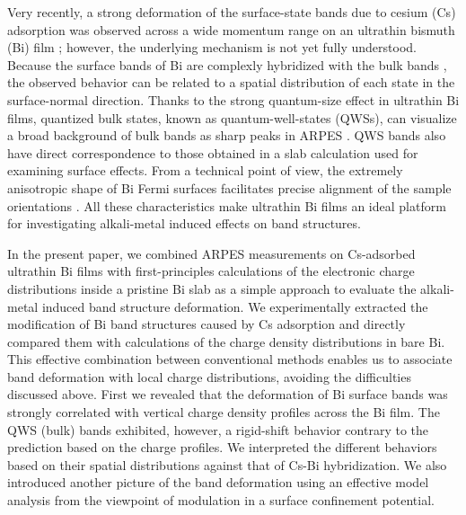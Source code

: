 \documentclass[reprint,secnumarabic,amssymb, nobibnotes, aps, prl,superscriptaddress,showpacs]{revtex4-1}
\begin{document}
Very recently, a strong deformation of the surface-state bands due to cesium (Cs) adsorption was observed across a wide momentum range on an ultrathin bismuth (Bi) film  \cite{matetskiy2017}; however, the underlying mechanism is not yet fully understood. Because the surface bands of Bi are complexly hybridized with the bulk bands \cite{hofmann2006}, the observed behavior can be related to a spatial distribution of each state in the surface-normal direction. Thanks to the strong quantum-size effect in ultrathin Bi films, quantized bulk states, known as quantum-well-states (QWSs), can visualize a broad background of bulk bands as sharp peaks in ARPES \cite{chiang2000,hirahara2007,bian2009,takayama2012,ito2016}. QWS bands also have direct correspondence to those obtained in a slab calculation used for examining surface effects. From a technical point of view, the extremely anisotropic shape of Bi Fermi surfaces facilitates precise alignment of the sample orientations \cite{hofmann2006, ohtsubo2012}. All these characteristics make ultrathin Bi films an ideal platform for investigating alkali-metal induced effects on band structures.

In the present paper, we combined ARPES measurements on Cs-adsorbed ultrathin Bi films with first-principles calculations of the electronic charge distributions inside a pristine Bi slab as a simple approach to evaluate the alkali-metal induced band structure deformation. We experimentally extracted the modification of Bi band structures caused by Cs adsorption and directly compared them with calculations of the charge density distributions in bare Bi. This effective combination between conventional methods enables us to associate band deformation with local charge distributions, avoiding the difficulties discussed above. First we revealed that the deformation of Bi surface bands was strongly correlated with vertical charge density profiles across the Bi film. The QWS (bulk) bands exhibited, however, a rigid-shift behavior contrary to the prediction based on the charge profiles. We interpreted the different behaviors based on their spatial distributions against that of Cs-Bi hybridization. We also introduced another picture of the band deformation using an effective model analysis from the viewpoint of modulation in a surface confinement potential.
\end{document}
